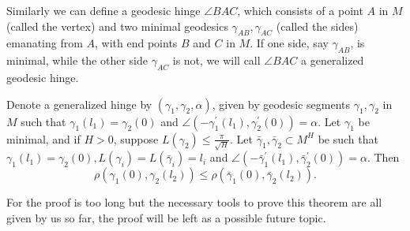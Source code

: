 \documentclass{ctexart}
\begin{document}
Similarly we can define a geodesic hinge $\angle B A C$, which consists of a point $A$ in $M$ (called the vertex) 
and two minimal geodesics $\gamma_{A B}, \gamma_{A C}$ (called the sides) emanating from $A$, with end points $B$ and $C$ in $M$. 
If one side, say $\gamma_{A B}$, is minimal, while the other side $\gamma_{A C}$ is not, we will call $\angle B A C$ a generalized geodesic hinge.
\begin{theorem}
  Denote a generalized hinge by $\left(\gamma_1, \gamma_2, \alpha\right)$, given by geodesic segments $\gamma_1, \gamma_2$ in $M$ such that 
  $\gamma_1\left(l_1\right)=\gamma_2(0)$ and $\angle\left(-\gamma_1^{\prime}\left(l_1\right), \gamma_2^{\prime}(0)\right)=\alpha$.   
  Let $\gamma_1$ be minimal, and if $H>0$, suppose $L\left(\gamma_2\right) \leq \frac{\pi}{\sqrt{H}}$.
  Let $\bar{\gamma}_1, \bar{\gamma}_2 \subset M^H$ be such that $\gamma_1\left(l_1\right)=\gamma_2(0), L\left(\gamma_i\right)=L\left(\bar{\gamma}_i\right)=l_i$ and 
  $\angle\left(-\bar{\gamma}_1^{\prime}\left(l_1\right), \bar{\gamma}_2^{\prime}(0)\right)=\alpha$. Then
  $$
  \rho\left(\gamma_1(0), \gamma_2\left(l_2\right)\right) \leq \rho\left(\bar{\gamma}_1(0), \bar{\gamma}_2\left(l_2\right)\right).
  $$    
\end{theorem}
For the proof is too long but the necessary tools to prove this theorem are all given by us so far, the proof will be left as a possible future topic. 






\end{document}
